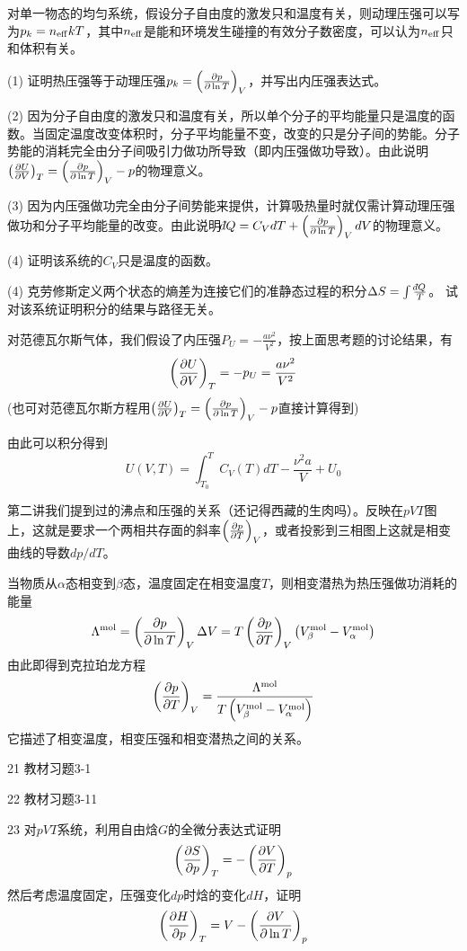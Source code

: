 \documentclass[CJK]{beamer}
\begin{document}
\begin{frame}
\bch
{\small
对单一物态的均匀系统，假设分子自由度的激发只和温度有关，则动理压强可以写为$p_k=n_{\rm eff} kT$，其中$n_{\rm eff}$是能和环境发生碰撞的有效分子数密度，可以认为$n_{\rm eff}$只和体积有关。
\bitem
\item[(1)]{证明热压强等于动理压强$p_k = \left(\frac{\partial p}{\partial \ln T}\right)_{V}$，并写出内压强表达式。}
\item[(2)]{因为分子自由度的激发只和温度有关，所以单个分子的平均能量只是温度的函数。当固定温度改变体积时，分子平均能量不变，改变的只是分子间的势能。分子势能的消耗完全由分子间吸引力做功所导致（即内压强做功导致）。由此说明$\left(\frac{\partial U}{\partial V}\right)_{T} = \left(\frac{\partial p}{\partial \ln T}\right)_{V} - p$的物理意义。}
\item[(3)]{因为内压强做功完全由分子间势能来提供，计算吸热量时就仅需计算动理压强做功和分子平均能量的改变。由此说明$\dbar Q = C_V dT + \pfrac p{\ln T}V dV$的物理意义。}
\item[(4)]{证明该系统的$C_V$只是温度的函数。}
\item[(4)]{克劳修斯定义两个状态的熵差为连接它们的准静态过程的积分$\Delta S = \int \frac{\dbar Q}{T}$。
试对该系统证明积分的结果与路径无关。}
\eitem
}
\ech
\end{frame}


\begin{frame}
\bch
{\small
对范德瓦尔斯气体，我们假设了内压强$P_U = -\frac{a\nu^2}{V^2}$，按上面思考题的讨论结果，有
$$\left(\frac{\partial U}{\partial V}\right)_{T} = -p_U = \frac{a\nu^2}{V^2}$$
{\small (也可对范德瓦尔斯方程用$\left(\frac{\partial U}{\partial V}\right)_{T} = \left(\frac{\partial p}{\partial \ln T}\right)_{V} - p$直接计算得到)}

由此可以积分得到
$$U(V, T) = \int_{T_0}^T C_V(T) dT -\frac{\nu^2a}{V} + U_0$$
}
\ech
\end{frame}


\begin{frame}
\bch
第二讲我们提到过的沸点和压强的关系（还记得西藏的生肉吗）。反映在$pVT$图上，这就是要求一个两相共存面的斜率$\left(\frac{\partial p}{\partial T}\right)_{V}$，或者投影到三相图上这就是相变曲线的导数$dp/dT$。
 
\ech
\end{frame}

\begin{frame}
\bch
当物质从$\alpha$态相变到$\beta$态，温度固定在相变温度$T$，则相变潜热为热压强做功消耗的能量
$$ \Lambda^{\rm mol} = \left(\frac{\partial p}{\partial \ln T}\right)_{V} \Delta V = T \left(\frac{\partial p}{\partial T}\right)_{V} \left(V_{\beta}^{\rm mol}-V_{\alpha}^{\rm mol}\right)$$
由此即得到{\blue 克拉珀龙方程
$$\left(\frac{\partial p}{\partial T}\right)_{V} = \frac{\Lambda^{\rm mol}}{T \left(V_{\beta}^{\rm mol}-V_{\alpha}^{\rm mol}\right)} $$}
它描述了相变温度，相变压强和相变潜热之间的关系。
\ech
\end{frame}





\begin{frame}
\bch

\bitem
\item[21]{ 教材习题3-1}
\item[22]{ 教材习题3-11}
\item[23]{ 对$pVT$系统，利用自由焓$G$的全微分表达式证明
$$\left(\frac{\partial S}{\partial p}\right)_{T} = - \left(\frac{\partial V}{\partial T}\right)_{p}$$
然后考虑温度固定，压强变化$dp$时焓的变化$dH$，证明
$$\left(\frac{\partial H}{\partial p}\right)_{T} = V - \left(\frac{\partial V}{\partial \ln T}\right)_{p}$$
}
\eitem
\ech
\end{frame}
\end{document}
